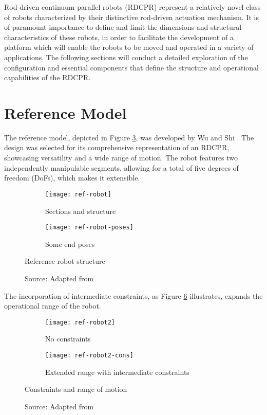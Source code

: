 Rod-driven continuum parallel robots (RDCPR) represent a relatively novel class of robots characterized by their distinctive rod-driven actuation mechanism. It is of paramount importance to define and limit the dimensions and structural characteristics of these robots, in order to facilitate the development of a platform which will enable the robots to be moved and operated in a variety of applications. The following sections will conduct a detailed exploration of the configuration and essential components that define the structure and operational capabilities of the RDCPR.

\section{Reference Model}

The reference model, depicted in Figure \ref{fig:ref-robot}, was developed by Wu and Shi \cite{wu2022}. The design was selected for its comprehensive representation of an RDCPR, showcasing versatility and a wide range of motion. The robot features two independently manipulable segments, allowing for a total of five degrees of freedom (DoFs), which makes it extensible.

\begin{figure}[H]
    \centering
    \begin{subfigure}[t]{0.3\textwidth}
        \texttt{[image: ref-robot]}
        \caption{Sections and structure}
        \label{fig:ref-robot-structure}
    \end{subfigure}
    \begin{subfigure}[t]{0.3\textwidth}
        \texttt{[image: ref-robot-poses]}
        \caption{Some end poses}
        \label{fig:ref-robot-poses}
    \end{subfigure}
    \caption{Reference robot structure}
    \caption*{Source: Adapted from \cite{wu2022}}
    \label{fig:ref-robot}
\end{figure}

The incorporation of intermediate constraints, as Figure \ref{fig:ref-robot2-constraints} illustrates, expands the operational range of the robot.

\begin{figure}[H]
    \centering
    \begin{subfigure}[t]{0.257\textwidth}
        \texttt{[image: ref-robot2]}
        \caption{No constraints}
        \label{fig:ref-robot2}
    \end{subfigure}
    \begin{subfigure}[t]{0.643\textwidth}
        \texttt{[image: ref-robot2-cons]}
        \caption{Extended range with intermediate constraints}
        \label{fig:ref-robot2-cons}
    \end{subfigure}
    \caption{Constraints and range of motion}
    \caption*{Source: Adapted from \cite{orekhov2017}}
    \label{fig:ref-robot2-constraints}
\end{figure}

